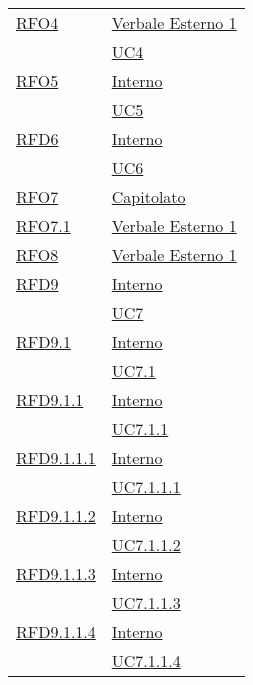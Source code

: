 \begin{longtable}{|>{\centering}m{5cm}|m{5cm}<{\centering}|}
\hyperlink{RFO4}{RFO4} & \hyperlink{Verbale Esterno 1}{Verbale Esterno 1}\\
& \hyperref[UC4]{UC4}\\ \hline

\hyperlink{RFO5}{RFO5} & \hyperlink{Interno}{Interno}\\
& \hyperref[UC5]{UC5}\\ \hline

\hyperlink{RFD6}{RFD6} & \hyperlink{Interno}{Interno}\\
& \hyperref[UC6]{UC6}\\ \hline

\hyperlink{RFO7}{RFO7} & \hyperlink{Capitolato}{Capitolato}\\ \hline

\hyperlink{RFO7.1}{RFO7.1} & \hyperlink{Verbale Esterno 1}{Verbale Esterno 1}\\ \hline

\hyperlink{RFO8}{RFO8} & \hyperlink{Verbale Esterno 1}{Verbale Esterno 1}\\ \hline

\hyperlink{RFD9}{RFD9} & \hyperlink{Interno}{Interno}\\
& \hyperref[UC7]{UC7}\\ \hline

\hyperlink{RFD9.1}{RFD9.1} & \hyperlink{Interno}{Interno}\\
& \hyperref[UC7.1]{UC7.1}\\ \hline

\hyperlink{RFD9.1.1}{RFD9.1.1} & \hyperlink{Interno}{Interno}\\
& \hyperref[UC7.1.1]{UC7.1.1}\\ \hline

\hyperlink{RFD9.1.1.1}{RFD9.1.1.1} & \hyperlink{Interno}{Interno}\\
& \hyperref[UC7.1.1.1]{UC7.1.1.1}\\ \hline

\hyperlink{RFD9.1.1.2}{RFD9.1.1.2} & \hyperlink{Interno}{Interno}\\
& \hyperref[UC7.1.1.2]{UC7.1.1.2}\\ \hline

\hyperlink{RFD9.1.1.3}{RFD9.1.1.3} & \hyperlink{Interno}{Interno}\\
& \hyperref[UC7.1.1.3]{UC7.1.1.3}\\ \hline

\hyperlink{RFD9.1.1.4}{RFD9.1.1.4} & \hyperlink{Interno}{Interno}\\
& \hyperref[UC7.1.1.4]{UC7.1.1.4}\\ \hline


\end{longtable}
